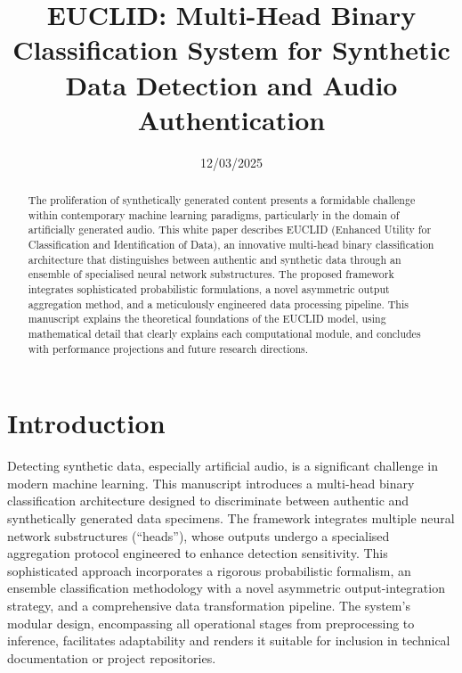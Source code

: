\documentclass[conference]{IEEEtran}  %
\title{\textbf{EUCLID: Multi-Head Binary Classification System for Synthetic Data Detection and Audio Authentication}}
\author{
    \IEEEauthorblockN{Sabian Hibbs BSc, MSc}
    \IEEEauthorblockA{Chief Technology Officer\\
    Uhmbrella Ltd.\\
    Email: sabian@uhmbrella.io}
}
\date{12/03/2025}
\begin{document}
\maketitle

\begin{abstract}
The proliferation of synthetically generated content presents a formidable challenge within contemporary machine learning paradigms, particularly in the domain of artificially generated audio. This white paper describes EUCLID (Enhanced Utility for Classification and Identification of Data), an innovative multi-head binary classification architecture that distinguishes between authentic and synthetic data through an ensemble of specialised neural network substructures. The proposed framework integrates sophisticated probabilistic formulations, a novel asymmetric output aggregation method, and a meticulously engineered data processing pipeline. This manuscript explains the theoretical foundations of the EUCLID model, using mathematical detail that clearly explains each computational module, and concludes with performance projections and future research directions.
\end{abstract}

\section{Introduction}
Detecting synthetic data, especially artificial audio, is a significant challenge in modern machine learning. This manuscript introduces a multi-head binary classification architecture designed to discriminate between authentic and synthetically generated data specimens. The framework integrates multiple neural network substructures (``heads''), whose outputs undergo a specialised aggregation protocol engineered to enhance detection sensitivity. This sophisticated approach incorporates a rigorous probabilistic formalism, an ensemble classification methodology with a novel asymmetric output-integration strategy, and a comprehensive data transformation pipeline. The system's modular design, encompassing all operational stages from preprocessing to inference, facilitates adaptability and renders it suitable for inclusion in technical documentation or project repositories.
\end{document}
